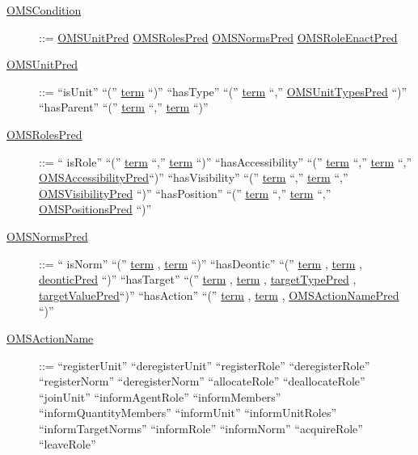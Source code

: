 \begin{description}


\item[\underline{OMSCondition}] ::= \underline{OMSUnitPred} \textbar \underline{OMSRolesPred} \textbar \underline{OMSNormsPred} \textbar \underline{OMSRoleEnactPred}

\item[\underline{OMSUnitPred}] ::=  ``isUnit'' ``('' \underline{term} ``)'' \textbar 
		``hasType'' ``('' \underline{term} ``,'' \underline{OMSUnitTypesPred} ``)'' \textbar
		``hasParent'' ``('' \underline{term} ``,'' \underline{term} ``)''

\item[\underline{OMSRolesPred}] ::= `` isRole'' ``('' \underline{term} ``,'' \underline{term} ``)'' \textbar 
		``hasAccessibility'' ``('' \underline{term} ``,'' \underline{term} ``,'' \underline{OMSAccessibilityPred}``)'' \textbar
		``hasVisibility'' ``('' \underline{term} ``,'' \underline{term} ``,'' \underline{OMSVisibilityPred} ``)'' \textbar 
		``hasPosition'' ``('' \underline{term} ``,'' \underline{term} ``,'' \underline{OMSPositionsPred} ``)''


\item[\underline{OMSNormsPred}] ::= `` isNorm'' ``('' \underline{term} , \underline{term} ``)'' \textbar 
		``hasDeontic'' ``('' \underline{term} , \underline{term} , \underline{deonticPred} ``)'' \textbar 
                 ``hasTarget'' ``('' \underline{term} , \underline{term} , \underline{targetTypePred} , \underline{targetValuePred}``)'' \textbar 
                 ``hasAction'' ``('' \underline{term} , \underline{term} , \underline{OMSActionNamePred} ``)''                  




\item[\underline{OMSActionName}] ::=  ``registerUnit''  \textbar ``deregisterUnit''  \textbar ``registerRole''  \textbar 
		``deregisterRole'' \textbar ``registerNorm'' \textbar ``deregisterNorm'' \textbar ``allocateRole''  \textbar
		``deallocateRole''  \textbar ``joinUnit'' \textbar ``informAgentRole''  \textbar ``informMembers'' \textbar
		``informQuantityMembers''  \textbar ``informUnit''  \textbar ``informUnitRoles''  \textbar 
		``informTargetNorms'' \textbar ``informRole''  \textbar ``informNorm''  \textbar ``acquireRole'' \textbar ``leaveRole'' 
                


\end{description}
